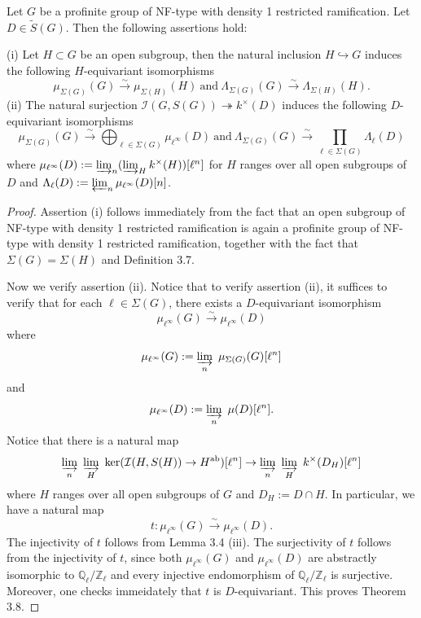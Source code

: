 \documentclass[10pt,a4paper]{amsart}
\begin{document}
\begin{thm}
Let $G$ be a profinite group of NF-type with density 1 restricted ramification. Let $D \in \widetilde{S}(G)$. Then the following assertions hold: \par 
(i) Let $H \subset G$ be an open subgroup, then the natural inclusion $H \hookrightarrow G$ induces the following $H$-equivariant isomorphisms
$$
\mu_{\Sigma(G)}(G) \xrightarrow{\sim} \mu_{\Sigma(H)}(H)~\text{and}~\Lambda_{\Sigma(G)}(G) \xrightarrow{\sim} \Lambda_{\Sigma(H)}(H).
$$
(ii) The natural surjection $\mathcal{I}(G,S(G)) \twoheadrightarrow k^{\times}(D)$ induces the following $D$-equivariant isomorphisms
$$
\mu_{\Sigma(G)}(G) \xrightarrow{\sim} \bigoplus_{\ell \in \Sigma(G)}\mu_{\ell^{\infty}}(D)~\text{and}~ \Lambda_{\Sigma(G)}(G) \xrightarrow{\sim} \prod_{\ell \in \Sigma(G)} \Lambda_\ell(D)
$$
where $\mu_{\ell^{\infty}}(D) := \varinjlim_n (\varinjlim_H k^{\times}(H))[\ell^n]$ for $H$ ranges over all open subgroups of $D$ and $\Lambda_\ell(D) := \varprojlim_n \mu_{\ell^{\infty}}(D)[n]$.
\end{thm}

\begin{proof}
Assertion (i) follows immediately from the fact that an open subgroup of NF-type with density 1 restricted ramification is again a profinite group of NF-type with density 1 restricted ramification, together with the fact that $\Sigma(G) = \Sigma(H)$ and Definition 3.7. \par 
Now we verify assertion (ii). Notice that to verify assertion (ii), it suffices to verify that for each $\ell \in \Sigma(G)$, there exists a $D$-equivariant isomorphism
$$
\mu_{\ell^{\infty}}(G) \xrightarrow{\sim} \mu_{\ell^{\infty}}(D)
$$
where
$$
\mu_{\ell^{\infty}}(G) := \varinjlim_n ~\mu_{\Sigma(G)}(G)[\ell^n]
$$
and
$$
\mu_{\ell^{\infty}}(D) := \varinjlim_n ~\mu(D)[\ell^n].
$$
Notice that there is a natural map
$$
\varinjlim_n ~\varinjlim_H ~\text{ker}(\mathcal{I}(H,S(H)) \to H^{\text{ab}})[\ell^n] \to \varinjlim_n ~\varinjlim_H~k^{\times}(D_H)[\ell^{n}]
$$
where $H$ ranges over all open subgroups of $G$ and $D_H := D \cap H$. In particular, we have a natural map
$$
t: \mu_{\ell^{\infty}}(G) \xrightarrow{\sim} \mu_{\ell^{\infty}}(D).
$$
The injectivity of $t$ follows from Lemma 3.4 (iii). The surjectivity of $t$ follows from the injectivity of $t$, since both $\mu_{\ell^{\infty}}(G)$ and $\mu_{\ell^{\infty}}(D)$ are abstractly isomorphic to $\mathbb{Q}_{\ell}/\mathbb{Z}_{\ell}$ and every injective endomorphism of $\mathbb{Q}_{\ell}/\mathbb{Z}_{\ell}$ is surjective. Moreover, one checks immeidately that $t$ is $D$-equivariant. This proves Theorem 3.8.
\end{proof}
\end{document}
